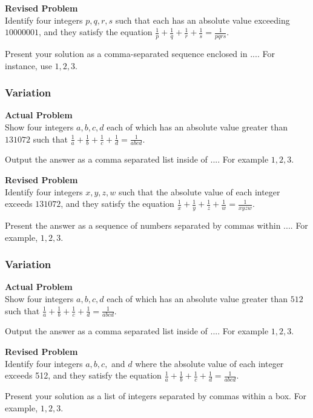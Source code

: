 \textbf{Revised Problem}\\
Identify four integers $p, q, r, s$ such that each has an absolute value exceeding $10000001$, and they satisfy the equation $\frac{1}{p} + \frac{1}{q} + \frac{1}{r} + \frac{1}{s} = \frac{1}{pqrs}$.

Present your solution as a comma-separated sequence enclosed in $\boxed{...}$. For instance, use $\boxed{1, 2, 3}$.

\subsubsection{Variation}
\textbf{Actual Problem}\\
Show four integers $a, b, c, d$ each of which has an absolute value greater than $131072$ such that $\frac{1}{a} + \frac{1}{b} + \frac{1}{c} + \frac{1}{d} = \frac{1}{abcd}$.

Output the answer as a comma separated list inside of $\boxed{...}$. For example $\boxed{1, 2, 3}$.

\textbf{Revised Problem}\\
Identify four integers $x, y, z, w$ such that the absolute value of each integer exceeds $131072$, and they satisfy the equation $\frac{1}{x} + \frac{1}{y} + \frac{1}{z} + \frac{1}{w} = \frac{1}{xyzw}$.

Present the answer as a sequence of numbers separated by commas within $\boxed{...}$. For example, $\boxed{1, 2, 3}$.

\subsubsection{Variation}
\textbf{Actual Problem}\\
Show four integers $a, b, c, d$ each of which has an absolute value greater than $512$ such that $\frac{1}{a} + \frac{1}{b} + \frac{1}{c} + \frac{1}{d} = \frac{1}{abcd}$.

Output the answer as a comma separated list inside of $\boxed{...}$. For example $\boxed{1, 2, 3}$.

\textbf{Revised Problem}\\
Identify four integers \( a, b, c, \) and \( d \) where the absolute value of each integer exceeds 512, and they satisfy the equation \(\frac{1}{a} + \frac{1}{b} + \frac{1}{c} + \frac{1}{d} = \frac{1}{abcd}\).

Present your solution as a list of integers separated by commas within a box. For example, \(\boxed{1, 2, 3}\).

